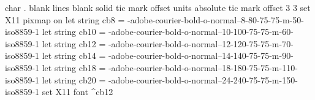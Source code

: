 char . blank
lines blank solid
tic mark offset units absolute
tic mark offset 3 3
set X11 pixmap on
let string cb8  = -adobe-courier-bold-o-normal--8-80-75-75-m-50-iso8859-1
let string cb10 = -adobe-courier-bold-o-normal--10-100-75-75-m-60-iso8859-1
let string cb12 = -adobe-courier-bold-o-normal--12-120-75-75-m-70-iso8859-1
let string cb14 = -adobe-courier-bold-o-normal--14-140-75-75-m-90-iso8859-1
let string cb18 = -adobe-courier-bold-o-normal--18-180-75-75-m-110-iso8859-1
let string cb20 = -adobe-courier-bold-o-normal--24-240-75-75-m-150-iso8859-1
set X11 font ^cb12
